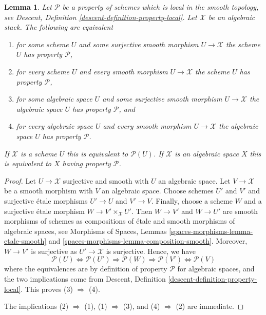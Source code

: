 \documentclass{stacks-project}
\theoremstyle{plain}
\newtheorem{lemma}[subsection]{Lemma}
\theoremstyle{definition}
\theoremstyle{remark}
\numberwithin{equation}{subsection}
\begin{document}
\begin{lemma}
\label{lemma-type-property}
Let $\mathcal{P}$ be a property of schemes which is local in the smooth
topology, see
Descent, Definition \ref{descent-definition-property-local}.
Let $\mathcal{X}$ be an algebraic stack. The following are equivalent
\begin{enumerate}
\item for some scheme $U$ and some surjective smooth morphism
$U \to \mathcal{X}$ the scheme $U$ has property $\mathcal{P}$,
\item for every scheme $U$ and every smooth morphism $U \to \mathcal{X}$
the scheme $U$ has property $\mathcal{P}$,
\item for some algebraic space $U$ and some surjective smooth morphism
$U \to \mathcal{X}$ the algebraic space $U$ has property $\mathcal{P}$, and
\item for every algebraic space $U$ and every smooth morphism
$U \to \mathcal{X}$ the algebraic space $U$ has property $\mathcal{P}$.
\end{enumerate}
If $\mathcal{X}$ is a scheme $U$ this is equivalent to $\mathcal{P}(U)$.
If $\mathcal{X}$ is an algebraic space $X$ this is equivalent to
$X$ having property $\mathcal{P}$.
\end{lemma}

\begin{proof}
Let $U \to \mathcal{X}$ surjective and smooth with $U$ an algebraic space.
Let $V \to \mathcal{X}$ be a smooth morphism with $V$ an algebraic space.
Choose schemes $U'$ and $V'$ and surjective \'etale morphisms
$U' \to U$ and $V' \to V$. Finally, choose a scheme $W$ and a
surjective \'etale morphism $W \to V' \times_\mathcal{X} U'$.
Then $W \to V'$ and $W \to U'$ are smooth morphisms of schemes
as compositions of \'etale and smooth morphisms of algebraic spaces, see
Morphisms of Spaces, Lemmas \ref{spaces-morphisms-lemma-etale-smooth} and
\ref{spaces-morphisms-lemma-composition-smooth}.
Moreover, $W \to V'$ is surjective as $U' \to \mathcal{X}$ is surjective.
Hence, we have
$$
\mathcal{P}(U) \Leftrightarrow
\mathcal{P}(U') \Rightarrow
\mathcal{P}(W) \Rightarrow
\mathcal{P}(V') \Leftrightarrow \mathcal{P}(V)
$$
where the equivalences are by definition of property $\mathcal{P}$ for
algebraic spaces, and the two implications come from
Descent, Definition \ref{descent-definition-property-local}.
This proves (3) $\Rightarrow$ (4).

\medskip\noindent
The implications (2) $\Rightarrow$ (1), (1) $\Rightarrow$ (3),
and (4) $\Rightarrow$ (2) are immediate.
\end{proof}
\end{document}
